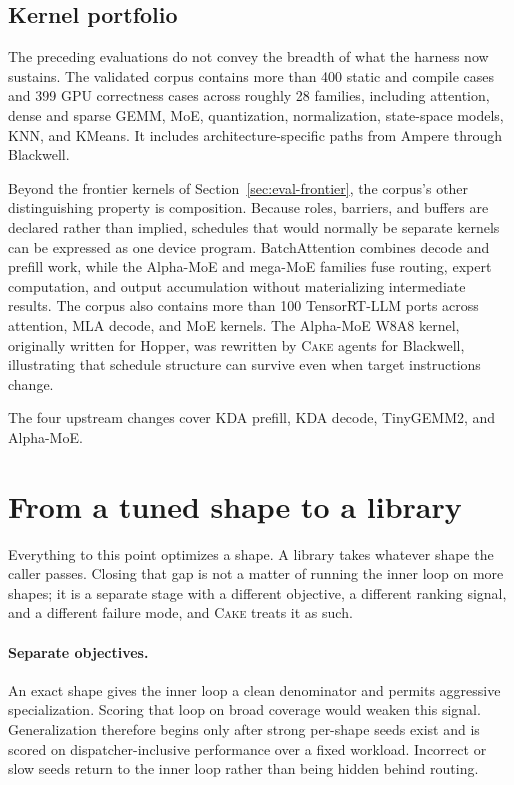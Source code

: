 \documentclass[11pt]{article}
\newcommand{\cake}{\textsc{Cake}}
\begin{document}
\subsection{Kernel portfolio}
\label{sec:eval-portfolio}

The preceding evaluations do not convey the breadth of what the harness now
sustains. The validated corpus contains more than 400 static and compile cases
and 399 GPU correctness cases across roughly 28 families, including attention,
dense and sparse GEMM, MoE, quantization, normalization, state-space models,
KNN, and KMeans. It includes architecture-specific paths from Ampere through
Blackwell.

Beyond the frontier kernels of Section~\ref{sec:eval-frontier}, the corpus's
other distinguishing property is composition. Because roles, barriers, and
buffers are declared rather than implied, schedules that would normally be
separate kernels can be expressed as one device program. BatchAttention combines
decode and prefill work, while the Alpha-MoE and mega-MoE families fuse routing,
expert computation, and output accumulation without materializing intermediate
results. The corpus also contains more than 100 TensorRT-LLM ports across
attention, MLA decode, and MoE kernels. The Alpha-MoE W8A8 kernel, originally
written for Hopper, was rewritten by \cake{} agents for Blackwell, illustrating
that schedule structure can survive even when target instructions change.

The four upstream changes cover KDA prefill, KDA decode, TinyGEMM2, and
Alpha-MoE.

\section{From a tuned shape to a library}
\label{sec:generalization}

Everything to this point optimizes a shape. A library takes whatever shape the
caller passes. Closing that gap is not a matter of running the inner loop on
more shapes; it is a separate stage with a different objective, a different
ranking signal, and a different failure mode, and \cake{} treats it as such.

\paragraph{Separate objectives.}
An exact shape gives the inner loop a clean denominator and permits aggressive
specialization. Scoring that loop on broad coverage would weaken this signal.
Generalization therefore begins only after strong per-shape seeds exist and is
scored on dispatcher-inclusive performance over a fixed workload. Incorrect or
slow seeds return to the inner loop rather than being hidden behind routing.
\end{document}
